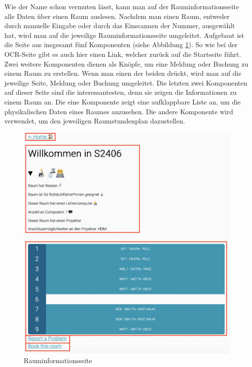 
Wie der Name schon vermuten lässt, kann man auf der Rauminformationsseite alle Daten über einen Raum auslesen. Nachdem man einen Raum, entweder durch manuelle Eingabe oder durch das Einscannen der Nummer, ausgewählt hat, wird man auf die jeweilige Rauminformationsseite umgeleitet. Aufgebaut ist die Seite aus insgesamt fünf Komponenten (siehe Abbildung \ref{fig:roominfoframes}). So wie bei der OCR-Seite gibt es auch hier einen Link, welcher zurück auf die Startseite führt. Zwei weitere Komponenten dienen als Knöpfe, um eine Meldung oder Buchung zu einem Raum zu erstellen. Wenn man einen der beiden drückt, wird man auf die jeweilige Seite, Meldung oder Buchung umgeleitet. Die letzten zwei Komponenten auf dieser Seite sind die interessantesten, denn sie zeigen die Informationen zu einem Raum an. Die eine Komponente zeigt eine aufklappbare Liste an, um die physikalischen Daten eines Raumes anzusehen. Die andere Komponente wird verwendet, um den jeweiligen Raumstundenplan dazustellen.

\begin{figure}[H]
    \centering
    \includegraphics[width=120mm]{media/WebComponents/Rauminformationsseite_frames.png}
    \caption{Rauminformationsseite}
    \label{fig:roominfoframes}
\end{figure}


